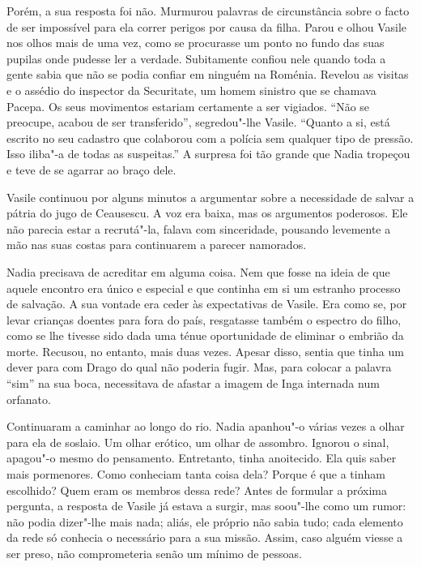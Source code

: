 Porém, a sua resposta foi não. Murmurou palavras de circunstância sobre
o facto de ser impossível para ela correr perigos por causa da filha.
Parou e olhou Vasile nos olhos mais de uma vez, como se procurasse um
ponto no fundo das suas pupilas onde pudesse ler a verdade. Subitamente confiou nele quando toda a gente sabia que não se podia confiar
em ninguém na Roménia. Revelou as visitas e o assédio do inspector da
Securitate, um homem sinistro que se chamava Pacepa. Os seus movimentos
estariam certamente a ser vigiados. ``Não se preocupe, acabou de ser
transferido'', segredou"-lhe Vasile. ``Quanto a si, está escrito no seu
cadastro que colaborou com a polícia sem qualquer tipo de pressão. Isso
iliba"-a de todas as suspeitas.'' A surpresa foi tão grande que Nadia
tropeçou e teve de se agarrar ao braço dele.

Vasile continuou por alguns minutos a argumentar
sobre a necessidade de salvar a pátria do jugo de Ceausescu. A voz era
baixa, mas os argumentos poderosos. Ele não parecia estar a recrutá"-la,
falava com sinceridade, pousando levemente a mão nas suas costas para
continuarem a parecer namorados.

Nadia precisava de acreditar em alguma coisa. Nem que fosse na ideia de
que aquele encontro era único e especial e que continha em si um
estranho processo de salvação. A sua vontade era ceder às expectativas
de Vasile. Era como se, por levar crianças doentes para fora do país,
resgatasse também o espectro do filho, como se lhe tivesse sido dada uma
ténue oportunidade de eliminar o embrião da morte. Recusou, no entanto,
mais duas vezes. Apesar disso, sentia que tinha um dever para com Drago
do qual
não poderia fugir. Mas, para colocar a palavra ``sim'' na sua boca,
necessitava de afastar a imagem de Inga internada num orfanato.

Continuaram a caminhar ao longo do rio. Nadia apanhou"-o várias vezes a
olhar para ela de soslaio. Um olhar erótico, um olhar de assombro.
Ignorou o sinal, apagou"-o mesmo do pensamento. Entretanto, tinha
anoitecido. Ela quis saber mais pormenores. Como conheciam tanta coisa
dela? Porque é que a tinham escolhido? Quem eram os membros dessa rede?
Antes de formular a próxima pergunta, a resposta de Vasile já estava a
surgir, mas soou"-lhe como um rumor: não podia dizer"-lhe mais nada;
aliás, ele próprio não sabia tudo; cada elemento da rede só conhecia o
necessário para a sua missão. Assim, caso alguém viesse a ser preso, não
comprometeria senão um mínimo de pessoas.

